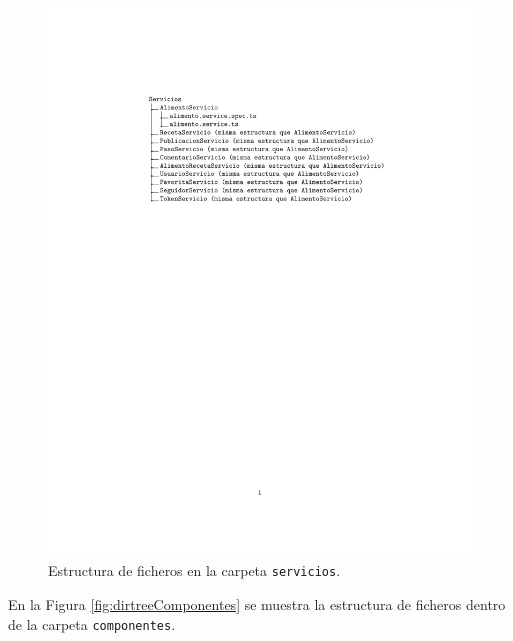 \begin{figure}
    \centering
    \includegraphics{img/dirtreeServicios.pdf}
    \caption{Estructura de ficheros en la carpeta \texttt{servicios}.}
    \label{fig:dirtreeServicios}
\end{figure}


En la Figura \ref{fig:dirtreeComponentes} se muestra la estructura de ficheros dentro de la carpeta \texttt{componentes}.

